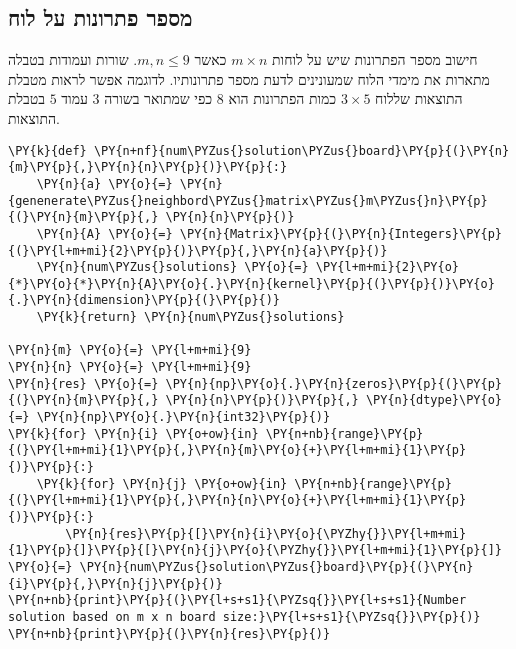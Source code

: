 \newpage
    \hypertarget{solution-amount}{%
\subsection{מספר פתרונות על לוח}\label{solution-amount}}
חישוב מספר הפתרונות שיש על לוחות 
$m\times n$ 
כאשר 
$m,n \le 9$.
שורות ועמודות בטבלה מתארות את מימדי הלוח שמעונינים לדעת מספר פתרונותיו.
לדוגמה אפשר לראות מטבלת התוצאות שללוח 
$3 \times 5$
כמות הפתרונות הוא 
$8$
כפי שמתואר בשורה 
$3$
עמוד 
$5$
בטבלת התוצאות.
\begin{english}
    \begin{tcolorbox}[breakable, size=fbox, boxrule=1pt, pad at break*=1mm,colback=cellbackground, colframe=cellborder]
\begin{Verbatim}[commandchars=\\\{\}]
\PY{k}{def} \PY{n+nf}{num\PYZus{}solution\PYZus{}board}\PY{p}{(}\PY{n}{m}\PY{p}{,}\PY{n}{n}\PY{p}{)}\PY{p}{:}
    \PY{n}{a} \PY{o}{=} \PY{n}{genenerate\PYZus{}neighbord\PYZus{}matrix\PYZus{}m\PYZus{}n}\PY{p}{(}\PY{n}{m}\PY{p}{,} \PY{n}{n}\PY{p}{)}
    \PY{n}{A} \PY{o}{=} \PY{n}{Matrix}\PY{p}{(}\PY{n}{Integers}\PY{p}{(}\PY{l+m+mi}{2}\PY{p}{)}\PY{p}{,}\PY{n}{a}\PY{p}{)}
    \PY{n}{num\PYZus{}solutions} \PY{o}{=} \PY{l+m+mi}{2}\PY{o}{*}\PY{o}{*}\PY{n}{A}\PY{o}{.}\PY{n}{kernel}\PY{p}{(}\PY{p}{)}\PY{o}{.}\PY{n}{dimension}\PY{p}{(}\PY{p}{)}
    \PY{k}{return} \PY{n}{num\PYZus{}solutions}

\PY{n}{m} \PY{o}{=} \PY{l+m+mi}{9}
\PY{n}{n} \PY{o}{=} \PY{l+m+mi}{9}
\PY{n}{res} \PY{o}{=} \PY{n}{np}\PY{o}{.}\PY{n}{zeros}\PY{p}{(}\PY{p}{(}\PY{n}{m}\PY{p}{,} \PY{n}{n}\PY{p}{)}\PY{p}{,} \PY{n}{dtype}\PY{o}{=} \PY{n}{np}\PY{o}{.}\PY{n}{int32}\PY{p}{)}
\PY{k}{for} \PY{n}{i} \PY{o+ow}{in} \PY{n+nb}{range}\PY{p}{(}\PY{l+m+mi}{1}\PY{p}{,}\PY{n}{m}\PY{o}{+}\PY{l+m+mi}{1}\PY{p}{)}\PY{p}{:}
    \PY{k}{for} \PY{n}{j} \PY{o+ow}{in} \PY{n+nb}{range}\PY{p}{(}\PY{l+m+mi}{1}\PY{p}{,}\PY{n}{n}\PY{o}{+}\PY{l+m+mi}{1}\PY{p}{)}\PY{p}{:}
        \PY{n}{res}\PY{p}{[}\PY{n}{i}\PY{o}{\PYZhy{}}\PY{l+m+mi}{1}\PY{p}{]}\PY{p}{[}\PY{n}{j}\PY{o}{\PYZhy{}}\PY{l+m+mi}{1}\PY{p}{]} \PY{o}{=} \PY{n}{num\PYZus{}solution\PYZus{}board}\PY{p}{(}\PY{n}{i}\PY{p}{,}\PY{n}{j}\PY{p}{)}
\PY{n+nb}{print}\PY{p}{(}\PY{l+s+s1}{\PYZsq{}}\PY{l+s+s1}{Number solution based on m x n board size:}\PY{l+s+s1}{\PYZsq{}}\PY{p}{)}
\PY{n+nb}{print}\PY{p}{(}\PY{n}{res}\PY{p}{)}
\end{Verbatim}
\end{tcolorbox}


\end{english}
